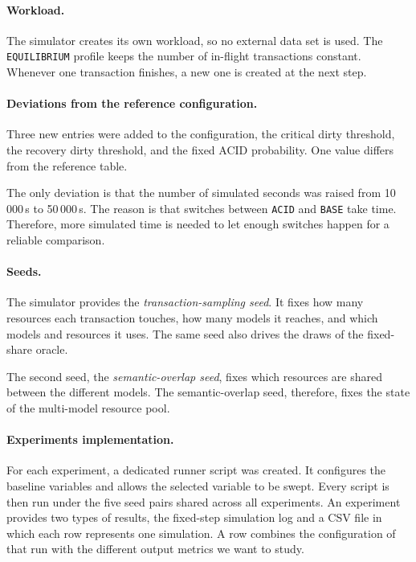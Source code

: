\paragraph{Workload.}\label{sec:exp-workload} The simulator creates its own
workload, so no external data set is used. The \texttt{EQUILIBRIUM} profile
keeps the number of in-flight transactions constant. Whenever one transaction
finishes, a new one is created at the next step.

\paragraph{Deviations from the reference configuration.} Three new entries were
added to the configuration, the critical dirty threshold, the recovery dirty
threshold, and the fixed ACID probability. One value differs from the reference
table.

The only deviation is that the number of simulated seconds was raised from
10\,000\,s to 50\,000\,s. The reason is that switches between \texttt{ACID} and
\texttt{BASE} take time. Therefore, more simulated time is needed to let enough
switches happen for a reliable comparison.

\paragraph{Seeds.} The simulator provides the \emph{transaction-sampling seed}.
It fixes how many resources each transaction touches, how many models it
reaches, and which models and resources it uses. The same seed also drives the
draws of the fixed-share oracle.

The second seed, the \emph{semantic-overlap seed}, fixes which resources are
shared between the different models. The semantic-overlap seed, therefore, fixes
the state of the multi-model resource pool.

\paragraph{Experiments implementation.} For each experiment, a dedicated runner
script was created. It configures the baseline variables and allows the selected
variable to be swept. Every script is then run under the five seed pairs shared
across all experiments. An experiment provides two types of results, the
fixed-step simulation log and a CSV file in which each row represents one
simulation. A row combines the configuration of that run with the different
output metrics we want to study.


